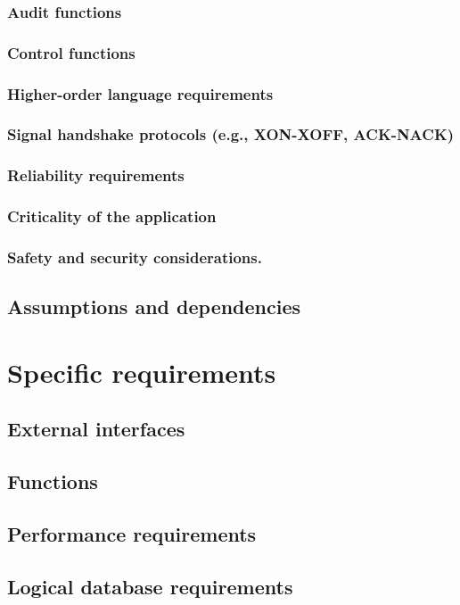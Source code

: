 \documentclass[draftclsnofoot,onecolumn,letterpaper,10pt,compsoc]{IEEEtran}
\begin{document}
		\subsubsection{Audit functions}
		\subsubsection{Control functions}
		\subsubsection{Higher-order language requirements}
		\subsubsection{Signal handshake protocols (e.g., XON-XOFF, ACK-NACK)}
		\subsubsection{Reliability requirements}
		\subsubsection{Criticality of the application}
		\subsubsection{Safety and security considerations.}
	\subsection{Assumptions and dependencies}

\section{Specific requirements}
	\subsection{External interfaces}
	\subsection{Functions}
	\subsection{Performance requirements}
	\subsection{Logical database requirements}
\end{document}
